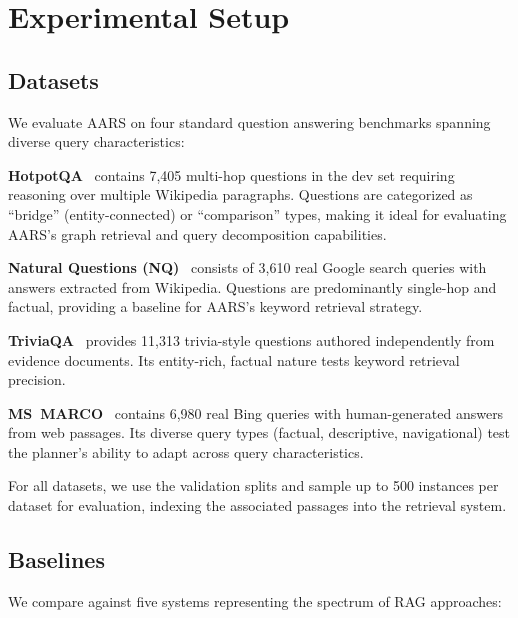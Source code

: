 \documentclass[runningheads]{llncs}
\begin{document}
\section{Experimental Setup}
\label{sec:experiments}

\subsection{Datasets}

We evaluate AARS on four standard question answering benchmarks spanning diverse query characteristics:

\textbf{HotpotQA}~\cite{Yang2018} contains 7,405 multi-hop questions in the dev set requiring reasoning over multiple Wikipedia paragraphs. Questions are categorized as ``bridge'' (entity-connected) or ``comparison'' types, making it ideal for evaluating AARS's graph retrieval and query decomposition capabilities.

\textbf{Natural Questions (NQ)}~\cite{Kwiatkowski2019} consists of 3,610 real Google search queries with answers extracted from Wikipedia. Questions are predominantly single-hop and factual, providing a baseline for AARS's keyword retrieval strategy.

\textbf{TriviaQA}~\cite{Joshi2017} provides 11,313 trivia-style questions authored independently from evidence documents. Its entity-rich, factual nature tests keyword retrieval precision.

\textbf{MS~MARCO}~\cite{Nguyen2016} contains 6,980 real Bing queries with human-generated answers from web passages. Its diverse query types (factual, descriptive, navigational) test the planner's ability to adapt across query characteristics.

For all datasets, we use the validation splits and sample up to 500 instances per dataset for evaluation, indexing the associated passages into the retrieval system.

\subsection{Baselines}

We compare against five systems representing the spectrum of RAG approaches:
\end{document}

